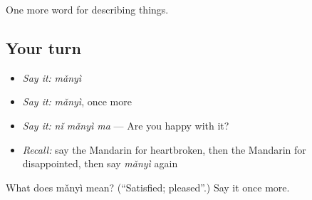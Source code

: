 \begin{grammarlens}[title={What you've built}]
One more word for describing things.
\end{grammarlens}

\subsection*{Your turn}
\begin{itemize}
\raggedright
  \item \emph{Say it:} \emph{mǎnyì}
  \item \emph{Say it:} \emph{mǎnyì}, once more
  \item \emph{Say it:} \emph{nǐ mǎnyì ma} — Are you happy with it?
  \item \emph{Recall:} say the Mandarin for heartbroken, then the Mandarin for disappointed, then say \emph{mǎnyì} again
\end{itemize}

\begin{tcolorbox}[breakable,colback=teal!4,colframe=teal!35!black,title={Before you move on}]
What does mǎnyì mean? (\textquotedblleft{}Satisfied; pleased\textquotedblright{}.) Say it once more.
\end{tcolorbox}
